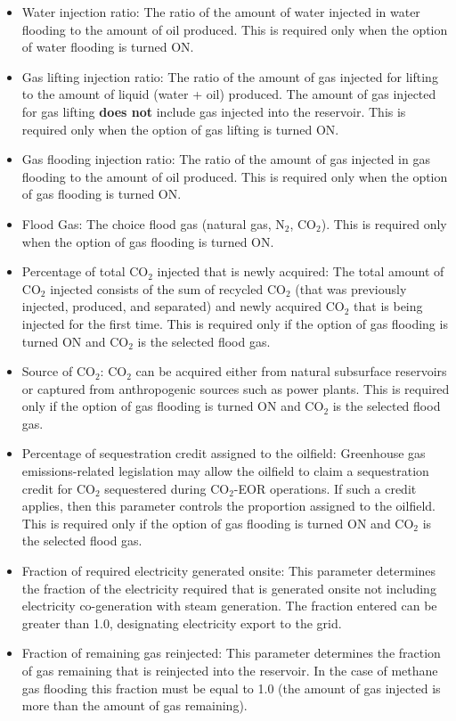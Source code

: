 \documentclass[11pt]{report}
\begin{document}
\begin{itemize}

\item Water injection ratio: The ratio of the amount of water injected in water flooding to the amount of oil produced. This is required only when the option of water flooding is turned ON.
\item Gas lifting injection ratio: The ratio of the amount of gas injected for lifting to the amount of liquid (water + oil) produced. The amount of gas injected for gas lifting \textbf{does not} include gas injected into the reservoir. This is required only when the option of gas lifting is turned ON. 
\item Gas flooding injection ratio: The ratio of the amount of gas injected in gas flooding to the amount of oil produced. This is required only when the option of gas flooding is turned ON.
\item Flood Gas: The choice flood gas (natural gas, N$_2$, CO$_2$). This is required only when the option of gas flooding is turned ON.
\item Percentage of total CO$_2$ injected that is newly acquired: The total amount of CO$_2$  injected consists of the sum of recycled CO$_2$ (that was previously injected, produced, and separated) and newly acquired CO$_2$ that is being injected for the first time. This is required only if the option of gas flooding is turned ON and CO$_2$ is the selected flood gas.
\item Source of CO$_2$: CO$_2$ can be acquired either from natural subsurface reservoirs or captured from anthropogenic sources such as power plants. This is required only if the option of gas flooding is turned ON and CO$_2$ is the selected flood gas.
\item Percentage of sequestration credit assigned to the oilfield: Greenhouse gas emissions-related legislation may allow the oilfield to claim a sequestration credit for CO$_2$ sequestered during CO$_2$-EOR operations. If such a credit applies, then this parameter controls the proportion assigned to the oilfield. This is required only if the option of gas flooding is turned ON and CO$_2$ is the selected flood gas.
\item Fraction of required electricity generated onsite: This parameter determines the fraction of the electricity required that is generated onsite not including electricity co-generation with steam generation. The fraction entered can be greater than 1.0, designating electricity export to the grid.
\item Fraction of remaining gas reinjected: This parameter determines the fraction of gas remaining that is reinjected into the reservoir. In the case of methane gas flooding this fraction must be equal to 1.0 (the amount of gas injected is more than the amount of gas remaining).

\end{itemize}
\end{document}
